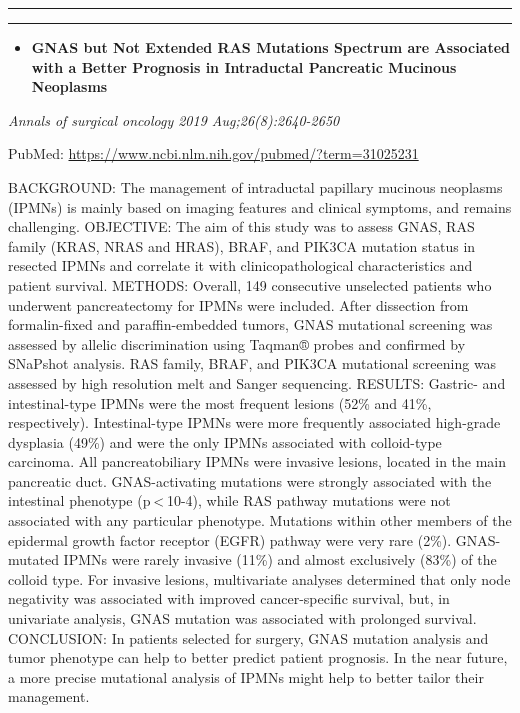 \documentclass[
]{article}
\providecommand{\tightlist}{%
  \setlength{\itemsep}{0pt}\setlength{\parskip}{0pt}}
\begin{document}
\begin{center}\rule{0.5\linewidth}{0.5pt}\end{center}

\begin{center}\rule{0.5\linewidth}{0.5pt}\end{center}

\begin{itemize}
\tightlist
\item
  \textbf{GNAS but Not Extended RAS Mutations Spectrum are Associated
  with a Better Prognosis in Intraductal Pancreatic Mucinous Neoplasms}
\end{itemize}

\emph{Annals of surgical oncology 2019 Aug;26(8):2640-2650}

PubMed: \url{https://www.ncbi.nlm.nih.gov/pubmed/?term=31025231}

BACKGROUND: The management of intraductal papillary mucinous neoplasms
(IPMNs) is mainly based on imaging features and clinical symptoms, and
remains challenging. OBJECTIVE: The aim of this study was to assess
GNAS, RAS family (KRAS, NRAS and HRAS), BRAF, and PIK3CA mutation status
in resected IPMNs and correlate it with clinicopathological
characteristics and patient survival. METHODS: Overall, 149 consecutive
unselected patients who underwent pancreatectomy for IPMNs were
included. After dissection from formalin-fixed and paraffin-embedded
tumors, GNAS mutational screening was assessed by allelic discrimination
using Taqman® probes and confirmed by SNaPshot analysis. RAS family,
BRAF, and PIK3CA mutational screening was assessed by high resolution
melt and Sanger sequencing. RESULTS: Gastric- and intestinal-type IPMNs
were the most frequent lesions (52\% and 41\%, respectively).
Intestinal-type IPMNs were more frequently associated high-grade
dysplasia (49\%) and were the only IPMNs associated with colloid-type
carcinoma. All pancreatobiliary IPMNs were invasive lesions, located in
the main pancreatic duct. GNAS-activating mutations were strongly
associated with the intestinal phenotype (p \textless{} 10-4), while RAS
pathway mutations were not associated with any particular phenotype.
Mutations within other members of the epidermal growth factor receptor
(EGFR) pathway were very rare (2\%). GNAS-mutated IPMNs were rarely
invasive (11\%) and almost exclusively (83\%) of the colloid type. For
invasive lesions, multivariate analyses determined that only node
negativity was associated with improved cancer-specific survival, but,
in univariate analysis, GNAS mutation was associated with prolonged
survival. CONCLUSION: In patients selected for surgery, GNAS mutation
analysis and tumor phenotype can help to better predict patient
prognosis. In the near future, a more precise mutational analysis of
IPMNs might help to better tailor their management.
\end{document}
